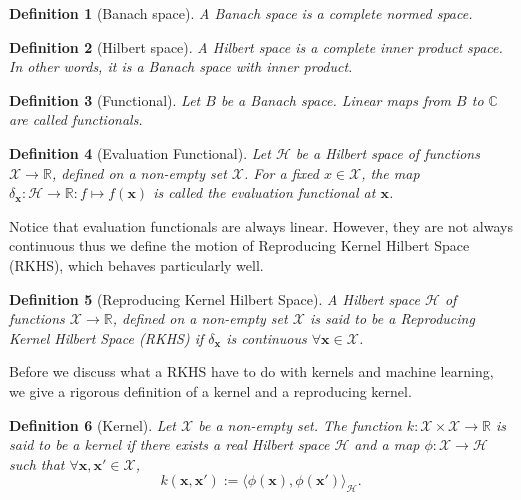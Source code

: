\documentclass[12pt,a4paper,oneside]{book}
\newtheorem{Definition}{Definition}
\begin{document}
\begin{Definition}[Banach space]
A Banach space is a complete normed space.
\end{Definition}

\begin{Definition}[Hilbert space]
A Hilbert space is a complete inner product space. In other words, it is a Banach space with inner product.
\end{Definition}

\begin{Definition}[Functional]
Let $B$ be a Banach space. Linear maps from $B$ to $\mathbb{C}$ are called functionals.
\end{Definition}

\begin{Definition}[Evaluation Functional]
Let $\mathcal{H}$ be a Hilbert space of functions $\mathcal{X} \rightarrow \mathbb{R}$, defined on a non-empty set $\mathcal{X}$. For a fixed $x \in \mathcal{X}$, the map $\delta_{\bm{x}} : \mathcal{H} \rightarrow \mathbb{R}: f \mapsto f(\bm{x})$ is called the evaluation functional at $\bm{x}$. 
\end{Definition}

Notice that evaluation functionals are always linear. However, they are not always continuous thus we define the motion of Reproducing Kernel Hilbert Space (RKHS), which behaves particularly well.

\begin{Definition}[Reproducing Kernel Hilbert Space]
A Hilbert space $\mathcal{H}$ of functions $\mathcal{X} \rightarrow \mathbb{R}$, defined on a non-empty set $\mathcal{X}$ is said to be a Reproducing Kernel Hilbert Space (RKHS) if $\delta_{\bm{x}}$ is continuous $\forall \bm{x} \in \mathcal{X}$.
\end{Definition}

Before we discuss what a RKHS have to do with kernels and machine learning, we give a rigorous definition of a kernel and a reproducing kernel.

\begin{Definition}[Kernel] \label{Functional_Kernel}
Let $\mathcal{X}$ be a non-empty set. The function $k: \mathcal{X} \times \mathcal{X} \rightarrow \mathbb{R}$ is said to be a kernel if there exists a real Hilbert space $\mathcal{H}$ and a map $\phi : \mathcal{X} \rightarrow \mathcal{H}$ such that $\forall \bm{x},\bm{x}' \in \mathcal{X}$,
\begin{equation}
k(\bm{x},\bm{x}') := \langle \phi(\bm{x}),\phi(\bm{x}') \rangle_{\mathcal{H}}.
\end{equation}
\end{Definition}
\end{document}
